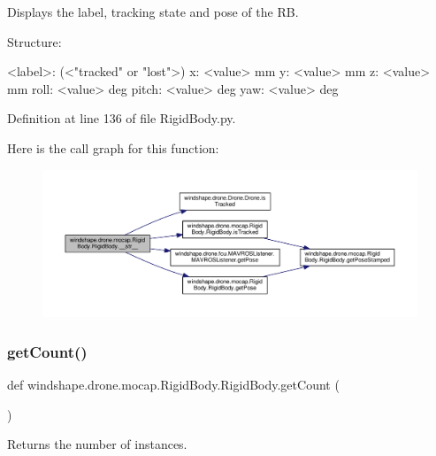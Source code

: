 \begin{DoxyVerb}Displays the label, tracking state and pose of the RB.

Structure:

    <label>: (<"tracked" or "lost">)
x: <value> mm
y: <value> mm
z: <value> mm
roll: <value> deg
pitch: <value> deg
yaw: <value> deg
\end{DoxyVerb}
 

Definition at line 136 of file Rigid\+Body.\+py.

Here is the call graph for this function\+:\nopagebreak
\begin{figure}[H]
\begin{center}
\leavevmode
\includegraphics[width=350pt]{classwindshape_1_1drone_1_1mocap_1_1_rigid_body_1_1_rigid_body_afdba89fb5adee293cf44812c6887dc1a_cgraph}
\end{center}
\end{figure}
\mbox{\label{classwindshape_1_1drone_1_1mocap_1_1_rigid_body_1_1_rigid_body_a3aff2207a3be020c656a63240f4c6a42}} 
\subsubsection{\texorpdfstring{get\+Count()}{getCount()}}
{\footnotesize\ttfamily def windshape.\+drone.\+mocap.\+Rigid\+Body.\+Rigid\+Body.\+get\+Count (\begin{DoxyParamCaption}{ }\end{DoxyParamCaption})\hspace{0.3cm}{\ttfamily [static]}}

\begin{DoxyVerb}Returns the number of instances.\end{DoxyVerb}
 

